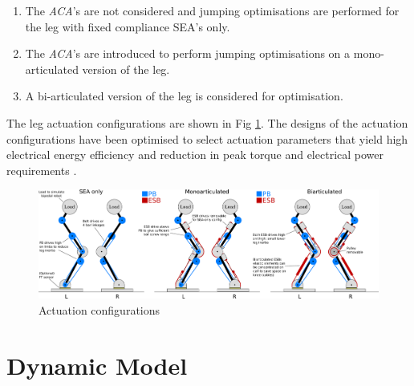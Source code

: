 \documentclass[letterpaper, 10 pt, conference]{ieeeconf}  %
\begin{document}
\begin{enumerate}
	\item The \textit{ACA}'s are not considered and jumping optimisations are performed for the leg with fixed compliance SEA's only.
	\item The \textit{ACA}'s are introduced to perform jumping optimisations on a mono-articulated version of the leg. 
	\item A bi-articulated version of the leg is considered for optimisation.
\end{enumerate}
The leg actuation configurations are shown in Fig \ref{fig:configurations}. The designs of the actuation configurations have been optimised to select actuation
parameters that yield high electrical energy efficiency and reduction in peak torque and electrical power requirements \cite{roozing2016design}.



\begin{figure}[ht]
	\centering
	\includegraphics[width=\linewidth]{3-DoF_leg_concept}
	\caption{Actuation configurations}
	\label{fig:configurations}
\end{figure}

\section{Dynamic Model} \label{sec:dynamicModel}
\end{document}
